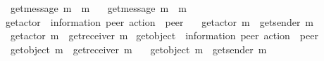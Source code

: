 \begin{isabellebody}
\ \ {\isachardoublequoteopen}get{\isacharunderscore}{\kern0pt}message\ {\isacharparenleft}{\kern0pt}{\isacharbang}{\kern0pt}{\isasymlangle}m{\isasymrangle}{\isacharparenright}{\kern0pt}\ {\isacharequal}{\kern0pt}\ m{\isachardoublequoteclose}\ {\isacharbar}{\kern0pt}\isanewline
\ \ {\isachardoublequoteopen}get{\isacharunderscore}{\kern0pt}message\ {\isacharparenleft}{\kern0pt}{\isacharquery}{\kern0pt}{\isasymlangle}m{\isasymrangle}{\isacharparenright}{\kern0pt}\ {\isacharequal}{\kern0pt}\ m{\isachardoublequoteclose}\isanewline
\isanewline
{}\isamarkupfalse%
\ get{\isacharunderscore}{\kern0pt}actor\ {\isacharcolon}{\kern0pt}{\isacharcolon}{\kern0pt}\ {\isachardoublequoteopen}{\isacharparenleft}{\kern0pt}{\isacharprime}{\kern0pt}information{\isacharcomma}{\kern0pt}\ {\isacharprime}{\kern0pt}peer{\isacharparenright}{\kern0pt}\ action\ {\isasymRightarrow}\ {\isacharprime}{\kern0pt}peer{\isachardoublequoteclose}\ \isanewline
\ \ {\isachardoublequoteopen}get{\isacharunderscore}{\kern0pt}actor\ {\isacharparenleft}{\kern0pt}{\isacharbang}{\kern0pt}{\isasymlangle}m{\isasymrangle}{\isacharparenright}{\kern0pt}\ {\isacharequal}{\kern0pt}\ get{\isacharunderscore}{\kern0pt}sender\ m{\isachardoublequoteclose}\ {\isacharbar}{\kern0pt}\isanewline
\ \ {\isachardoublequoteopen}get{\isacharunderscore}{\kern0pt}actor\ {\isacharparenleft}{\kern0pt}{\isacharquery}{\kern0pt}{\isasymlangle}m{\isasymrangle}{\isacharparenright}{\kern0pt}\ {\isacharequal}{\kern0pt}\ get{\isacharunderscore}{\kern0pt}receiver\ m{\isachardoublequoteclose}\isanewline
\isanewline
{}\isamarkupfalse%
\ get{\isacharunderscore}{\kern0pt}object\ {\isacharcolon}{\kern0pt}{\isacharcolon}{\kern0pt}\ {\isachardoublequoteopen}{\isacharparenleft}{\kern0pt}{\isacharprime}{\kern0pt}information{\isacharcomma}{\kern0pt}\ {\isacharprime}{\kern0pt}peer{\isacharparenright}{\kern0pt}\ action\ {\isasymRightarrow}\ {\isacharprime}{\kern0pt}peer{\isachardoublequoteclose}\ \isanewline
\ \ {\isachardoublequoteopen}get{\isacharunderscore}{\kern0pt}object\ {\isacharparenleft}{\kern0pt}{\isacharbang}{\kern0pt}{\isasymlangle}m{\isasymrangle}{\isacharparenright}{\kern0pt}\ {\isacharequal}{\kern0pt}\ get{\isacharunderscore}{\kern0pt}receiver\ m{\isachardoublequoteclose}\ {\isacharbar}{\kern0pt}\isanewline
\ \ {\isachardoublequoteopen}get{\isacharunderscore}{\kern0pt}object\ {\isacharparenleft}{\kern0pt}{\isacharquery}{\kern0pt}{\isasymlangle}m{\isasymrangle}{\isacharparenright}{\kern0pt}\ {\isacharequal}{\kern0pt}\ get{\isacharunderscore}{\kern0pt}sender\ m{\isachardoublequoteclose}\isanewline

\end{isabellebody}
